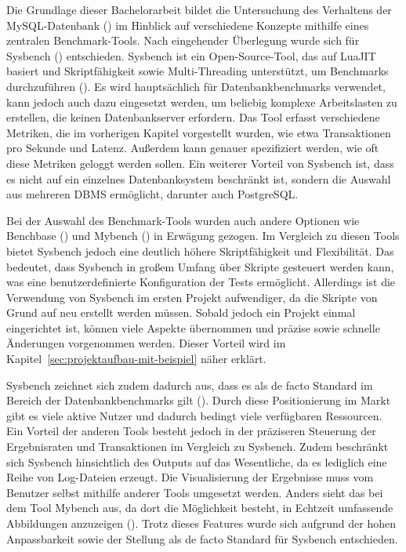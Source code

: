 Die Grundlage dieser Bachelorarbeit bildet die Untersuchung des Verhaltens der MySQL-Datenbank (\cite{sysbench_mysql}) im Hinblick auf verschiedene Konzepte mithilfe eines zentralen Benchmark-Tools.
Nach eingehender Überlegung wurde sich für Sysbench (\cite{sysbench_repo}) entschieden.
Sysbench ist ein Open-Source-Tool, das auf LuaJIT basiert und Skriptfähigkeit sowie Multi-Threading unterstützt, um Benchmarks durchzuführen (\cite[S. 50–66]{schwartz2012high}).
Es wird hauptsächlich für Datenbankbenchmarks verwendet, kann jedoch auch dazu eingesetzt werden, um beliebig komplexe Arbeitslasten zu erstellen, die keinen Datenbankserver erfordern.
Das Tool erfasst verschiedene Metriken, die im vorherigen Kapitel vorgestellt wurden, wie etwa Transaktionen pro Sekunde und Latenz.
Außerdem kann genauer spezifiziert werden, wie oft diese Metriken geloggt werden sollen.
Ein weiterer Vorteil von Sysbench ist, dass es nicht auf ein einzelnes Datenbanksystem beschränkt ist, sondern die Auswahl aus mehreren DBMS ermöglicht, darunter auch PostgreSQL\@.

Bei der Auswahl des Benchmark-Tools wurden auch andere Optionen wie Benchbase (\cite{DifallahPCC13}) und Mybench (\cite{mybench_repo}) in Erwägung gezogen.
Im Vergleich zu diesen Tools bietet Sysbench jedoch eine deutlich höhere Skriptfähigkeit und Flexibilität.
Das bedeutet, dass Sysbench in großem Umfang über Skripte gesteuert werden kann, was eine benutzerdefinierte Konfiguration der Tests ermöglicht.
Allerdings ist die Verwendung von Sysbench im ersten Projekt aufwendiger, da die Skripte von Grund auf neu erstellt werden müssen.
Sobald jedoch ein Projekt einmal eingerichtet ist, können viele Aspekte übernommen und präzise sowie schnelle Änderungen vorgenommen werden.
Dieser Vorteil wird im Kapitel~\ref{sec:projektaufbau-mit-beispiel} näher erklärt.

Sysbench zeichnet sich zudem dadurch aus, dass es als de facto Standard im Bereich der Datenbankbenchmarks gilt (\cite{mybench_comparison}).
Durch diese Positionierung im Markt gibt es viele aktive Nutzer und dadurch bedingt viele verfügbaren Ressourcen.
Ein Vorteil der anderen Tools besteht jedoch in der präziseren Steuerung der Ergebnisraten und Transaktionen im Vergleich zu Sysbench.
Zudem beschränkt sich Sysbench hinsichtlich des Outputs auf das Wesentliche, da es lediglich eine Reihe von Log-Dateien erzeugt.
Die Visualisierung der Ergebnisse muss vom Benutzer selbst mithilfe anderer Tools umgesetzt werden.
Anders sieht das bei dem Tool Mybench aus, da dort die Möglichkeit besteht, in Echtzeit umfassende Abbildungen anzuzeigen (\cite{mybench_user_interface}).
Trotz dieses Features wurde sich aufgrund der hohen Anpassbarkeit sowie der Stellung als de facto Standard für Sysbench entschieden.

